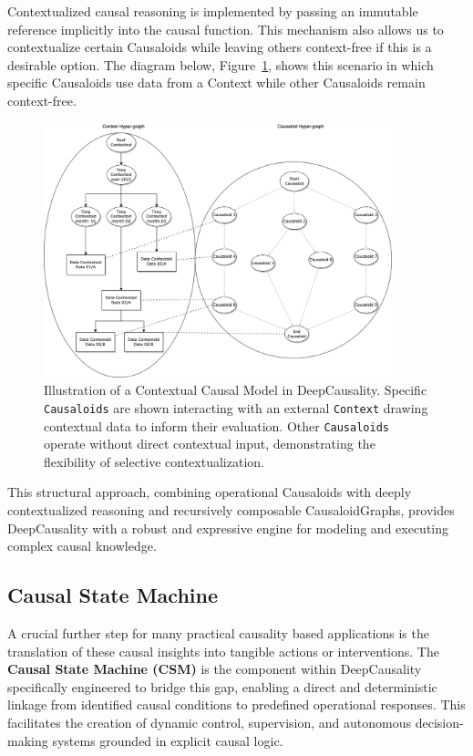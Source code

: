 Contextualized causal reasoning is implemented by passing an immutable reference implicitly into the causal function. This mechanism also allows us to contextualize certain Causaloids while leaving others context-free if this is a desirable option. The diagram below, Figure~\ref{fig:contextual_causal_model}, shows this scenario in which specific Causaloids use data from a Context while other Causaloids remain context-free.

\begin{figure}[H] %
    \centering
    \includegraphics[width=0.9\textwidth]{img/contextual-model.png} %
    \caption{Illustration of a Contextual Causal Model in DeepCausality. Specific \texttt{Causaloids} are shown interacting with an external \texttt{Context}  drawing contextual data to inform their evaluation. Other \texttt{Causaloids} operate without direct contextual input, demonstrating the flexibility of selective contextualization.}
    \label{fig:contextual_causal_model}
\end{figure}

This structural approach, combining operational Causaloids with deeply contextualized reasoning and recursively composable CausaloidGraphs, provides DeepCausality with a robust and expressive engine for modeling and executing complex causal knowledge.

\newpage

\subsection{Causal State Machine}
\label{subsec:csm}

A crucial further step for many practical causality based applications is the translation of these causal insights into tangible actions or interventions. The \textbf{Causal State Machine (CSM)} is the component within DeepCausality specifically engineered to bridge this gap, enabling a direct and deterministic linkage from identified causal conditions to predefined operational responses. This facilitates the creation of dynamic control, supervision, and autonomous decision-making systems grounded in explicit causal logic.

